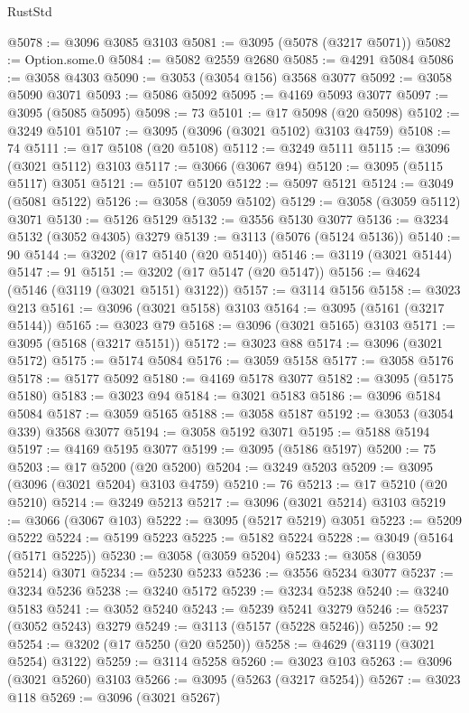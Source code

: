 \begin{lexlean}{RustStd}
\begin{coremodule}
{\begin{coremodule}
{{{{{{{{{{{{{{{{{{{{{{{{{{{{{{{{@5078 := @3096 @3085 @3103
@5081 := @3095 (@5078 (@3217 @5071))
@5082 := Option.some.{0}
@5084 := @5082 @2559 @2680
@5085 := @4291 @5084
@5086 := @3058 @4303
@5090 := @3053 (@3054 @156) @3568 @3077
@5092 := @3058 @5090 @3071
@5093 := @5086 @5092
@5095 := @4169 @5093 @3077
@5097 := @3095 (@5085 @5095)
@5098 := 73
@5101 := @17 @5098 (@20 @5098)
@5102 := @3249 @5101
@5107 := @3095 (@3096 (@3021 @5102) @3103 @4759)
@5108 := 74
@5111 := @17 @5108 (@20 @5108)
@5112 := @3249 @5111
@5115 := @3096 (@3021 @5112) @3103
@5117 := @3066 (@3067 @94)
@5120 := @3095 (@5115 @5117) @3051
@5121 := @5107 @5120
@5122 := @5097 @5121
@5124 := @3049 (@5081 @5122)
@5126 := @3058 (@3059 @5102)
@5129 := @3058 (@3059 @5112) @3071
@5130 := @5126 @5129
@5132 := @3556 @5130 @3077
@5136 := @3234 @5132 (@3052 @4305) @3279
@5139 := @3113 (@5076 (@5124 @5136))
@5140 := 90
@5144 := @3202 (@17 @5140 (@20 @5140))
@5146 := @3119 (@3021 @5144)
@5147 := 91
@5151 := @3202 (@17 @5147 (@20 @5147))
@5156 := @4624 (@5146 (@3119 (@3021 @5151) @3122))
@5157 := @3114 @5156
@5158 := @3023 @213
@5161 := @3096 (@3021 @5158) @3103
@5164 := @3095 (@5161 (@3217 @5144))
@5165 := @3023 @79
@5168 := @3096 (@3021 @5165) @3103
@5171 := @3095 (@5168 (@3217 @5151))
@5172 := @3023 @88
@5174 := @3096 (@3021 @5172)
@5175 := @5174 @5084
@5176 := @3059 @5158
@5177 := @3058 @5176
@5178 := @5177 @5092
@5180 := @4169 @5178 @3077
@5182 := @3095 (@5175 @5180)
@5183 := @3023 @94
@5184 := @3021 @5183
@5186 := @3096 @5184 @5084
@5187 := @3059 @5165
@5188 := @3058 @5187
@5192 := @3053 (@3054 @339) @3568 @3077
@5194 := @3058 @5192 @3071
@5195 := @5188 @5194
@5197 := @4169 @5195 @3077
@5199 := @3095 (@5186 @5197)
@5200 := 75
@5203 := @17 @5200 (@20 @5200)
@5204 := @3249 @5203
@5209 := @3095 (@3096 (@3021 @5204) @3103 @4759)
@5210 := 76
@5213 := @17 @5210 (@20 @5210)
@5214 := @3249 @5213
@5217 := @3096 (@3021 @5214) @3103
@5219 := @3066 (@3067 @103)
@5222 := @3095 (@5217 @5219) @3051
@5223 := @5209 @5222
@5224 := @5199 @5223
@5225 := @5182 @5224
@5228 := @3049 (@5164 (@5171 @5225))
@5230 := @3058 (@3059 @5204)
@5233 := @3058 (@3059 @5214) @3071
@5234 := @5230 @5233
@5236 := @3556 @5234 @3077
@5237 := @3234 @5236
@5238 := @3240 @5172
@5239 := @3234 @5238
@5240 := @3240 @5183
@5241 := @3052 @5240
@5243 := @5239 @5241 @3279
@5246 := @5237 (@3052 @5243) @3279
@5249 := @3113 (@5157 (@5228 @5246))
@5250 := 92
@5254 := @3202 (@17 @5250 (@20 @5250))
@5258 := @4629 (@3119 (@3021 @5254) @3122)
@5259 := @3114 @5258
@5260 := @3023 @103
@5263 := @3096 (@3021 @5260) @3103
@5266 := @3095 (@5263 (@3217 @5254))
@5267 := @3023 @118
@5269 := @3096 (@3021 @5267)
}}}}}}}}}}}}}}}}}}}}}}}}}}}}}}}}
\end{coremodule}}
\end{coremodule}
\end{lexlean}
